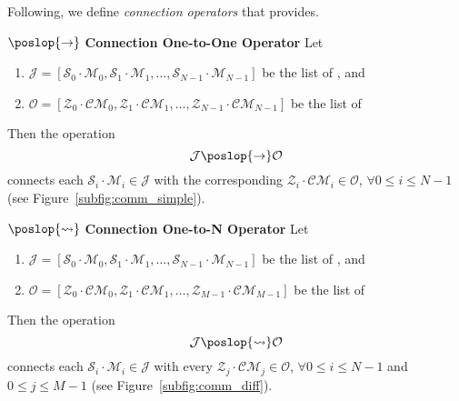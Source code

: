 
\separation

Following, we define \textit{connection operators} that \posl{} provides.

\begin{definition}\label{op_conn:1to1}
$\poslop{\rightarrow}$ {\bf Connection One-to-One Operator} Let 
\begin{enumerate}
\item $\mathcal{J} = \left[\mathcal{S}_0\cdot \mathcal{M}_0, \mathcal{S}_1\cdot \mathcal{M}_1,\dots, \mathcal{S}_{N-1}\cdot \mathcal{M}_{N-1}\right]$ be the list of \jacks, and
\item $\mathcal{O} = \left[\mathcal{Z}_0\cdot \mathcal{CM}_0, \mathcal{Z}_1\cdot \mathcal{CM}_1,\dots, \mathcal{Z}_{N-1}\cdot \mathcal{CM}_{N-1}\right]$ be the list of \outlets{}
\end{enumerate} Then the operation 
\[
\mathcal{J} \poslop{\rightarrow} \mathcal{O}
\]
connects each \jack{} $\mathcal{S}_i\cdot \mathcal{M}_i \in \mathcal{J}$ with the corresponding \outlet{} $\mathcal{Z}_i\cdot \mathcal{CM}_i \in \mathcal{O}$, $\forall 0 \leq i \leq N-1$ (see Figure~\ref{subfig:comm_simple}).
\end{definition}

\separation

\begin{definition}\label{op_conn:1ton}
$\poslop{\rightsquigarrow}$ {\bf Connection One-to-N Operator} Let 
\begin{enumerate} 
\item $\mathcal{J} = \left[\mathcal{S}_0\cdot \mathcal{M}_0, \mathcal{S}_1\cdot \mathcal{M}_1,\dots, \mathcal{S}_{N-1}\cdot \mathcal{M}_{N-1}\right]$ be the list of \jacks, and 
\item $\mathcal{O} = \left[\mathcal{Z}_0\cdot \mathcal{CM}_0, \mathcal{Z}_1\cdot \mathcal{CM}_1,\dots, \mathcal{Z}_{M-1}\cdot \mathcal{CM}_{M-1}\right]$ be the list of \outlets{} 
\end{enumerate} Then the operation 
\[
\mathcal{J} \poslop{\rightsquigarrow} \mathcal{O}
\]
connects each \jack{} $\mathcal{S}_i\cdot \mathcal{M}_i \in \mathcal{J}$ with every \outlet{} $\mathcal{Z}_j\cdot \mathcal{CM}_j \in \mathcal{O}$, $\forall 0 \leq i \leq N-1$ and $0 \leq j \leq M-1$ (see Figure~\ref{subfig:comm_diff}).
\end{definition}

